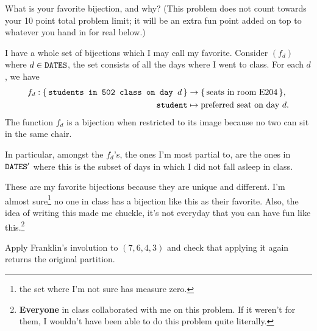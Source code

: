 \documentclass[12pt]{memoir}
\begin{document}
\begin{Ej}
What is your favorite bijection, and why? (This problem does not count towards your 10 point total problem limit; it will be an extra fun point added on top to whatever you hand in for real below.)
\end{Ej}

\begin{ptcbr}
I have a whole set of bijections which I may call my favorite. Consider $(f_d)$ where $d\in\texttt{DATES}$, the set  consists of all the days where I went to class. For each $d$, we have 
\begin{align*}
f_d:\{\,\texttt{students in 502 class on day }d\,\}&\to\{\,\text{seats in room E204}\,\},\\
\texttt{student}&\mapsto\text{preferred seat on day }d.    
\end{align*}
The function $f_d$ is a bijection when restricted to its image because no two  can sit in the same chair.\par
In particular, amongst the $f_d$'s, the ones I'm most partial to, are the ones in $\texttt{DATES}'$ where this is the subset of days in which I did not fall asleep in class.\par 
These are my favorite bijections because they are unique and different. I'm almost sure\footnote{the set where I'm not sure has measure zero.} no one in class has a bijection like this as their favorite. Also, the idea of writing this made me chuckle, it's not everyday that you can have fun like this.\footnote{\textbf{Everyone} in class collaborated with me on this problem. If it weren't for them, I wouldn't have been able to do this problem quite literally.} 
\end{ptcbr}

\begin{Ej}[Exercise 2]
Apply Franklin's involution to $(7,6,4,3)$ and check that applying it again returns the original partition.
\end{Ej}
\end{document}
